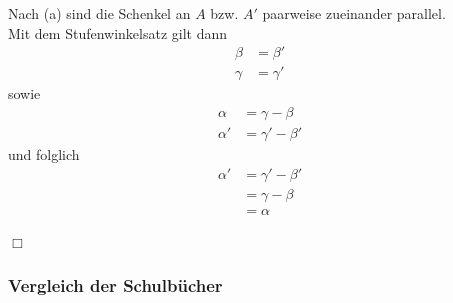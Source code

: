 \documentclass[11pt]{article}
\begin{document}
\begin{enumerate}[(a)]
\begin{center}
	\end{center}
	Nach (a) sind die Schenkel an $ A $ bzw. $ A' $ paarweise zueinander parallel.\\
	Mit dem Stufenwinkelsatz gilt dann
	\begin{equation*}
	\begin{aligned}
	\beta &= \beta'\\
	\gamma &= \gamma'
	\end{aligned}
	\end{equation*}
	sowie
	\begin{equation*}
	\begin{aligned}
	\alpha &= \gamma - \beta\\
	\alpha' &= \gamma' - \beta'
	\end{aligned}
	\end{equation*}
	und folglich
	\begin{equation*}
	\begin{aligned}
	\alpha' &= \gamma' - \beta'\\
	&= \gamma - \beta\\
	&= \alpha
	\end{aligned}
	\end{equation*}
\end{enumerate}
\begin{flushright}
	$ \Box $
\end{flushright}
\subsubsection*{Vergleich der Schulbücher}
\end{document}
